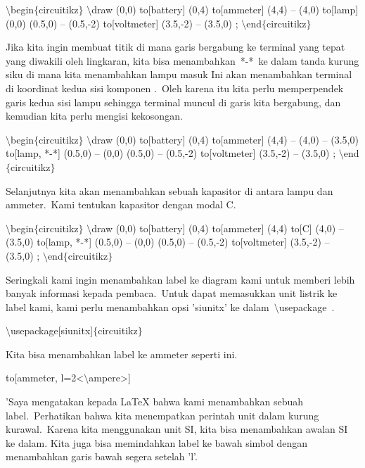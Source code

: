 \noindent 
 $\setminus$begin$ \{ $circuitikz$ \} $ $\setminus$draw (0,0) to[battery] (0,4) to[ammeter] (4,4) -- (4,0) to[lamp] (0,0) (0.5,0) -- (0.5,-2) to[voltmeter] (3.5,-2) -- (3.5,0) ; $\setminus$end$ \{ $circuitikz$ \} $ 
\par


\noindent 
Jika kita ingin membuat titik di mana garis bergabung ke terminal yang tepat yang diwakili oleh lingkaran, kita bisa menambahkan *-* ke dalam tanda kurung siku di mana kita menambahkan lampu masuk Ini akan menambahkan terminal di koordinat kedua sisi komponen . Oleh karena itu kita perlu memperpendek garis kedua sisi lampu sehingga terminal muncul di garis kita bergabung, dan kemudian kita perlu mengisi kekosongan.
\par


\noindent 
 $\setminus$begin$ \{ $circuitikz$ \} $ $\setminus$draw (0,0) to[battery] (0,4) to[ammeter] (4,4) -- (4,0) -- (3.5,0) to[lamp, *-*] (0.5,0) -- (0,0) (0.5,0) -- (0.5,-2) to[voltmeter] (3.5,-2) -- (3.5,0) ; $\setminus$end$ \{ $circuitikz$ \} $ 
\par


\noindent 
Selanjutnya kita akan menambahkan sebuah kapasitor di antara lampu dan ammeter. Kami tentukan kapasitor dengan modal C.
\par


\noindent 
 $\setminus$begin$ \{ $circuitikz$ \} $ $\setminus$draw (0,0) to[battery] (0,4) to[ammeter] (4,4) to[C] (4,0) -- (3.5,0) to[lamp, *-*] (0.5,0) -- (0,0) (0.5,0) -- (0.5,-2) to[voltmeter] (3.5,-2) -- (3.5,0) ; $\setminus$end$ \{ $circuitikz$ \} $ 
\par


\noindent 
Seringkali kami ingin menambahkan label ke diagram kami untuk memberi lebih banyak informasi kepada pembaca. Untuk dapat memasukkan unit listrik ke label kami, kami perlu menambahkan opsi 'siunitx' ke dalam $\setminus$usepackage .
\par


\noindent 
 $\setminus$usepackage[siunitx]$ \{ $circuitikz$ \} $ 
\par


\noindent 
Kita bisa menambahkan label ke ammeter seperti ini.
\par


\noindent 
 to[ammeter, l=2<$\setminus$ampere>] 
\par


\noindent 
'Saya mengatakan kepada LaTeX bahwa kami menambahkan sebuah label. Perhatikan bahwa kita menempatkan perintah unit dalam kurung kurawal. Karena kita menggunakan unit SI, kita bisa menambahkan awalan SI ke dalam. Kita juga bisa memindahkan label ke bawah simbol dengan menambahkan garis bawah segera setelah 'l'.
\par


